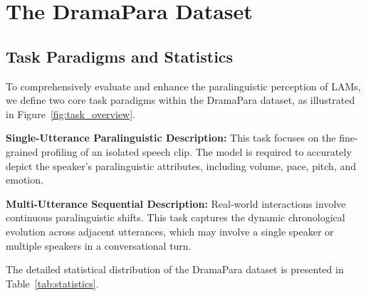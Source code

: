 \documentclass{Interspeech}
\begin{document}

\section{The DramaPara Dataset}
\label{sec:dataset}

\subsection{Task Paradigms and Statistics}
To comprehensively evaluate and enhance the paralinguistic perception of LAMs, we define two core task paradigms within the DramaPara dataset, as illustrated in Figure~\ref{fig:task_overview}.

\textbf{Single-Utterance Paralinguistic Description:} This task focuses on the fine-grained profiling of an isolated speech clip. The model is required to accurately depict the speaker's paralinguistic attributes, including volume, pace, pitch, and emotion.

\textbf{Multi-Utterance Sequential Description:} Real-world interactions involve continuous paralinguistic shifts. This task captures the dynamic chronological evolution across adjacent utterances, which may involve a single speaker or multiple speakers in a conversational turn.

The detailed statistical distribution of the DramaPara dataset is presented in Table~\ref{tab:statistics}.

\begin{table}[th]
\vspace{-0.2cm}
  \caption{Statistical overview of the DramaPara dataset.}
  \label{tab:statistics}
  \centering
\vspace{-0.3cm}
\end{table}
\end{document}
